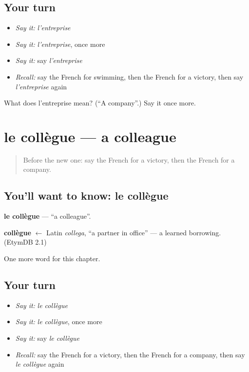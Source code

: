\subsection*{Your turn}
\begin{itemize}
\raggedright
  \item \emph{Say it:} \emph{l'entreprise}
  \item \emph{Say it:} \emph{l'entreprise}, once more
  \item \emph{Say it:} say \emph{l'entreprise}
  \item \emph{Recall:} say the French for swimming, then the French for a victory, then say \emph{l'entreprise} again
\end{itemize}

\begin{tcolorbox}[breakable,colback=teal!4,colframe=teal!35!black,title={Before you move on}]
What does l'entreprise mean? (\textquotedblleft{}A company\textquotedblright{}.) Say it once more.
\end{tcolorbox}
\section[le collègue]{le collègue — a colleague}

\label{lesson:FR-C174-collegue}



\begin{quote}
Before the new one: say the French for a victory, then the French for a company.
\end{quote}

\subsection*{You'll want to know: le collègue}
\textbf{le collègue} — \textquotedblleft{}a colleague\textquotedblright{}.

\begin{cousinweb}
\textbf{collègue} $\leftarrow$ Latin \emph{collega}, \textquotedblleft{}a partner in office\textquotedblright{} — a learned borrowing. (EtymDB 2.1)
\end{cousinweb}

\begin{grammarlens}[title={What you've built}]
One more word for this chapter.
\end{grammarlens}

\subsection*{Your turn}
\begin{itemize}
\raggedright
  \item \emph{Say it:} \emph{le collègue}
  \item \emph{Say it:} \emph{le collègue}, once more
  \item \emph{Say it:} say \emph{le collègue}
  \item \emph{Recall:} say the French for a victory, then the French for a company, then say \emph{le collègue} again
\end{itemize}

